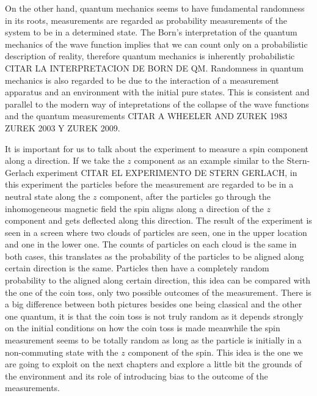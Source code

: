 On the other hand, quantum mechanics seems to have fundamental randomness in its roots, measurements are regarded as probability measurements of the system to be in a determined state.  The Born's interpretation of the quantum mechanics of the wave function implies that we can count only on a probabilistic description of reality, therefore quantum mechanics is inherently probabilistic CITAR LA INTERPRETACION DE BORN DE QM. Randomness in quantum mechanics is also regarded to be due to the interaction of a measurement apparatus and an environment with the initial pure states. This is consistent and parallel to the modern way of intepretations of the collapse of the wave functions and the quantum measurements CITAR A WHEELER AND ZUREK 1983 ZUREK 2003 Y ZUREK 2009.\par 

It is important for us to talk about the experiment to measure a spin component along a direction. If we take the $z$ component  as an example similar to the Stern-Gerlach experiment CITAR EL EXPERIMENTO DE STERN GERLACH, in this experiment the particles before the measurement are regarded to be in a neutral state along the $z$ component, after the particles go through the inhomogeneous magnetic field the spin aligns along a direction of the $z$ component and gets deflected along this direction. The result of the experiment is seen in a screen where two clouds of particles are seen, one in the upper location and one in the lower one. The counts of particles on each cloud is the same in both cases, this translates as the probability of the particles to be aligned along certain direction is the same. Particles then have a completely random probability to the aligned along certain direction, this idea can be compared with the one of the coin toss, only two possible outcomes of the measurement. There is a big difference between both pictures besides one being classical and the other one quantum, it is that the coin toss is not truly random as it depends strongly on the initial conditions on how the coin toss is made meanwhile the spin measurement seems to be totally random as long as the particle is initially in a non-commuting state with the $z$ component of the spin. This idea is the one we are going to exploit on the next chapters and explore a little bit the grounds of the environment and its role of introducing bias to the outcome of the measurements.


